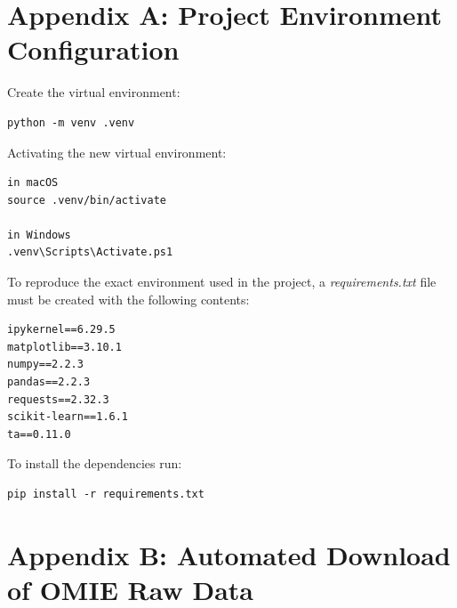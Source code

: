 \documentclass[12pt]{report} %
\begin{document}
\appendix



\chapter* {Appendix A: Project Environment Configuration}
\label{app:appendix_a_env_setup}

\noindent Create the virtual environment:
\begin{verbatim}
python -m venv .venv
\end{verbatim}

\noindent Activating the new virtual environment:
\begin{verbatim}
in macOS
source .venv/bin/activate

in Windows
.venv\Scripts\Activate.ps1
\end{verbatim}

\noindent To reproduce the exact environment used in the project, a \textit{requirements.txt} file must be created with the following contents:
\begin{verbatim}
ipykernel==6.29.5
matplotlib==3.10.1
numpy==2.2.3
pandas==2.2.3
requests==2.32.3
scikit-learn==1.6.1
ta==0.11.0
\end{verbatim}

\noindent To install the dependencies run:
\begin{verbatim}
pip install -r requirements.txt 
\end{verbatim}



\chapter* {Appendix B: Automated Download of OMIE Raw Data}
\label{app:appendix_b_data_scrapping}
\end{document}
